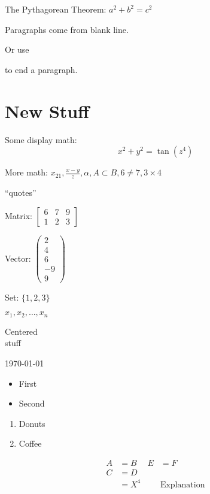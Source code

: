 \documentclass[12pt]{article}
\begin{document}
The Pythagorean Theorem: \(a^2+b^2=c^2\)

Paragraphs come from blank line.

Or use \par to end a paragraph.

\section{New Stuff}

Some display math: \[x^2 + y^2 = \tan(z^4)\]

More math: \(x_{21}, \frac{x-y}{z}, \alpha, A\subset B, 6\neq 7, 3\times 4\)

``quotes''

Matrix:
\(\begin{bmatrix}
6 & 7 & 9\\
1 & 2 & 3
\end{bmatrix}\)


Vector:
\(\begin{pmatrix}
2\\
4\\
6\\
-9\\
9
\end{pmatrix}\)

Set: \(\{1, 2, 3\}\)

\(x_1, x_2,\ldots, x_n\)

\begin{center}
Centered\\
stuff
\end{center}

\centerline{\today}

\begin{itemize}
\item First
\item Second
\end{itemize}

\begin{enumerate}
\item Donuts
\item Coffee
\end{enumerate}

\begin{align*}
A &= B  &  E &= F\\
C &= D\\
&=X^4 & &\text{Explanation}
\end{align*}
\end{document}
